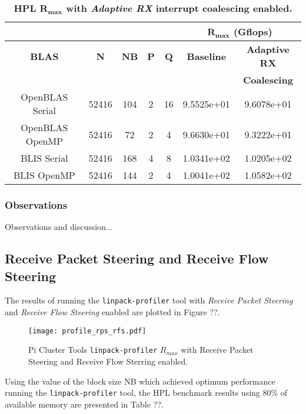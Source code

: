 \begin{table}[H]
\begin{center}
\begin{tabular}{ |c|c|c|c|c|c|c| } 
\hline
\multicolumn{5}{|c}{} & \multicolumn{2}{|c|}{$\mathbf{R_{max}}$ \textbf{(Gflops)}} \\
\hline
\textbf{BLAS} & \textbf{N} & \textbf{NB} & \textbf{P} & \textbf{Q} & \textbf{Baseline}  & \textbf{Adaptive RX}  \\
              &            &             &            &            &                    & \textbf{Coalescing} \\
\hline
OpenBLAS Serial & 52416 & 104 & 2 & 16 & 9.5525e+01 & 9.6078e+01 \\
\hline
OpenBLAS OpenMP & 52416 & 72 & 2 & 4 & 9.6630e+01 & 9.3222e+01 \\
\hline
BLIS Serial     & 52416 & 168 & 4 & 8 & 1.0341e+02 & 1.0205e+02 \\
\hline
BLIS OpenMP     & 52416 & 144 & 2 & 4 & 1.0041e+02 & 1.0582e+02 \\
\hline
\end{tabular}
\end{center}
\caption{\label{tab:table-name}\textbf{HPL $\mathbf{R_{max}}$ with \emph{Adaptive RX} interrupt coalescing enabled.}}
\end{table}

\subsubsection{Observations}

Observations and discussion...


%
%
\subsection{Receive Packet Steering and Receive Flow Steering}

The results of running the \verb|linpack-profiler| tool with \emph{Receive Packet Steering} and \emph{Receive Flow Steering} enabled are plotted in Figure ??.

\begin{figure}[h!]
	\centering
	\texttt{[image: profile\_rps\_rfs.pdf]}
	\caption{Pi Cluster Tools \texttt{linpack-profiler} $R_{max}$ with Receive Packet Steering and Receive Flow Sterring enabled.}
	\label{fig:subim1}
\end{figure}

Using the value of the block size NB which achieved optimum performance running the \texttt{linpack-profiler} tool, the HPL benchmark results using 80\% of available memory are presented in Table ??. 

